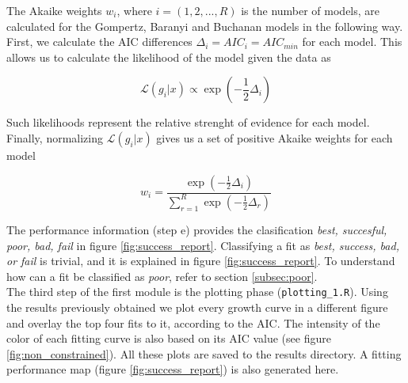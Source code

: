 \documentclass[titlepage,11pt]{article}
\begin{document}
\begin{linenumbers}
			The Akaike weights $ w_i $, where $ i  = (1, 2, ..., R)$ is the number of models, are calculated for the Gompertz, Baranyi and Buchanan models in the following way. \cite{Anderson2002}\\
			First, we calculate the AIC differences $ \Delta_i = AIC_i = AIC_{min}$ for each model. This allows us to calculate the likelihood of the model given the data as
			\begin{linenomath*}
				\begin{equation}
				\mathcal{L}(g_i|x) \propto \exp\left(-\frac 1 2 \Delta_i\right)
				\end{equation}
			\end{linenomath*}
			Such likelihoods represent the relative strenght of evidence for each model.
			Finally, normalizing $ \mathcal{L}(g_i|x) $ gives us a set of positive Akaike weights for each model
			\begin{linenomath*}
				\begin{equation}
				w_i = \frac{\exp\left(-\frac 1 2 \Delta_i\right)}{\sum\limits_{r = 1}^{R}\exp\left(-\frac 1 2 \Delta_r\right)}
				\end{equation}
			\end{linenomath*}
			The performance information (step e) provides the clasification \textit{best, succesful, poor, bad, fail} in figure \ref{fig:success_report}.  Classifying a fit as \textit{best, success, bad, or fail} is trivial, and it is explained in figure \ref{fig:success_report}. To understand how can a fit be classified as \textit{poor}, refer to section \ref{subsec:poor}.\\
			
			The third step of the first module is the plotting phase (\verb|plotting_1.R|). Using the results previously obtained we plot every growth curve in a different figure and overlay the top four fits to it, according to the AIC. The intensity of the color of each fitting curve is also based on its AIC value (see figure \ref{fig:non_constrained}). All these plots are saved to the results directory. A fitting performance map (figure \ref{fig:success_report}) is also generated here.

\end{linenumbers}
\end{document}
